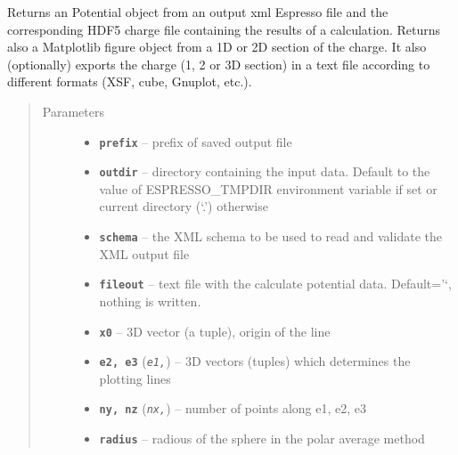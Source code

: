 \documentclass[letterpaper,10pt,english]{sphinxmanual}
\begin{document}
\begin{fulllineitems}
\label{postqe:postqe.api.compute_potential}
Returns an Potential object from an output xml Espresso file and the
corresponding HDF5 charge file containing the results of a calculation.
Returns also a Matplotlib figure object from a 1D or 2D section of the charge.
It also (optionally) exports the charge (1, 2 or 3D section) in a text file according to
different formats (XSF, cube, Gnuplot, etc.).
\begin{quote}\begin{description}
\item[{Parameters}] \leavevmode\begin{itemize}
\item {} 
\textbf{\texttt{prefix}} -- prefix of saved output file

\item {} 
\textbf{\texttt{outdir}} -- directory containing the input data. Default to the value of
ESPRESSO\_TMPDIR environment variable if set or current directory (`.') otherwise

\item {} 
\textbf{\texttt{schema}} -- the XML schema to be used to read and validate the XML output file

\item {} 
\textbf{\texttt{fileout}} -- text file with the calculate potential data. Default='`, nothing is written.

\item {} 
\textbf{\texttt{x0}} -- 3D vector (a tuple), origin of the line

\item {} 
\textbf{\texttt{e2, e3}} (\emph{\texttt{e1,}}) -- 3D vectors (tuples) which determines the plotting lines

\item {} 
\textbf{\texttt{ny, nz}} (\emph{\texttt{nx,}}) -- number of points along e1, e2, e3

\item {} 
\textbf{\texttt{radius}} -- radious of the sphere in the polar average method


\end{itemize}
\end{description}
\end{quote}
\end{fulllineitems}
\end{document}
